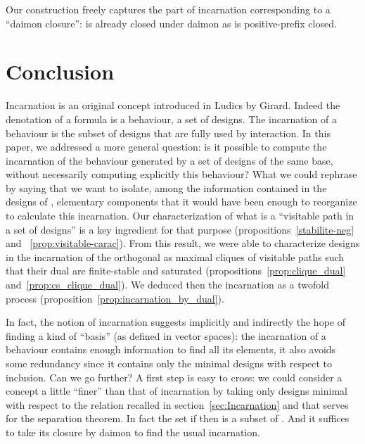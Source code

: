 \documentclass{LMCS}
\begin{document}
\rem Our construction freely captures the part of incarnation corresponding to a ``daimon closure'': 
 is already closed under daimon as   is positive-prefix closed.






\section{Conclusion}

 
Incarnation is an original concept introduced in Ludics by Girard. Indeed the denotation of a formula is a behaviour, a set of designs. The incarnation of a behaviour is the subset of designs that are fully used by interaction. In this paper, we addressed a more general question: is it possible to compute the incarnation of the behaviour generated by a set  of designs of the same base, without necessarily computing explicitly this behaviour?
What we could rephrase by saying that we want to isolate, among the information contained in the designs of , elementary components that it would have been enough to reorganize to calculate this incarnation. 
Our characterization of what is a ``visitable path in a set of designs'' is a key ingredient for that purpose (propositions~\ref{stabilite-neg} and ~\ref{prop:visitable-carac}). 
From this result, we were able to characterize designs in the incarnation of the orthogonal  as maximal cliques of visitable paths such that their dual are finite-stable and saturated (propositions~\ref{prop:clique_dual} and~\ref{prop:cs_clique_dual}).
We deduced then the incarnation as a twofold process (proposition~\ref{prop:incarnation_by_dual}).

In fact, the notion of incarnation suggests implicitly and indirectly the hope of finding a kind of ``basis'' (as defined in vector spaces): the incarnation of a behaviour contains enough information to find all its elements, it also avoids some redundancy since it contains only the minimal designs with respect to inclusion. Can we go further? A first step is easy to cross: we could consider a concept a little ``finer'' than that of incarnation by taking only designs minimal with respect to the relation  recalled in section~\ref{sec:Incarnation} and that serves for the separation theorem. In fact the set  if  then  is a subset of . 
And it suffices to take its closure by daimon to find the usual incarnation. 




\end{document}
